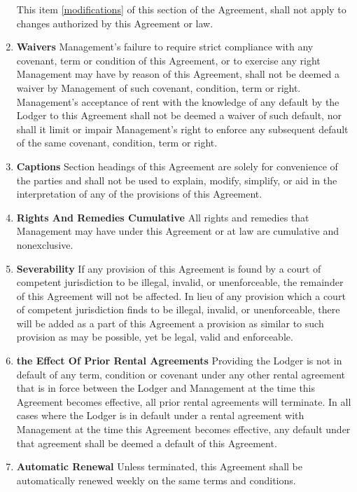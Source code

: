 \documentclass[12pt,letterpaper]{article}
\newcommand{\management}{Management}
\newcommand{\lodger}{Lodger}
\begin{document}
\begin{enumerate}
		This item \ref{modifications} of this section of the Agreement, shall not apply to changes authorized by this Agreement or law.
	\item \textbf{Waivers} \quad 
		\management{}'s failure to require strict compliance with any covenant, term or condition of this Agreement, or to exercise any right \management{} may have by reason of this Agreement, shall not be deemed a waiver by \management{} of such covenant, condition, term or right. \management{}'s acceptance of rent with the knowledge of any default by the \lodger{} to this Agreement shall not be deemed a waiver of such default, nor shall it limit or impair \management{}'s right to enforce any subsequent default of the same covenant, condition, term or right. 
	\item \textbf{Captions} \quad 
		Section headings of this Agreement are solely for convenience of the parties and shall not be used to explain, modify, simplify, or aid in the interpretation of any of the provisions of this Agreement. 
	\item \textbf{Rights And Remedies Cumulative} \quad 
		All rights and remedies that \management{} may have under this Agreement or at law are cumulative and nonexclusive. 
	\item \textbf{Severability} \quad 
		If any provision of this Agreement is found by a court of competent jurisdiction to be illegal, invalid, or unenforceable, the remainder of this Agreement will not be affected. In lieu of any provision which a court of competent jurisdiction finds to be illegal, invalid, or unenforceable, there will be added as a part of this Agreement a provision as similar to such provision as may be possible, yet be legal, valid and enforceable. 
	\item \textbf{the Effect Of Prior Rental Agreements} \quad 
		Providing the \lodger{} is not in default of any term, condition or covenant under any other rental agreement that is in force between the \lodger{} and \management{} at the time this Agreement becomes effective, all prior rental agreements will terminate. In all cases where the \lodger{} is in default under a rental agreement with \management{} at the time this Agreement becomes effective, any default under that agreement shall be deemed a default of this Agreement. 
	\item \textbf{Automatic Renewal} \quad 
		Unless terminated, this Agreement shall be automatically renewed weekly on the same terms and conditions. 
\end{enumerate}
\end{document}
